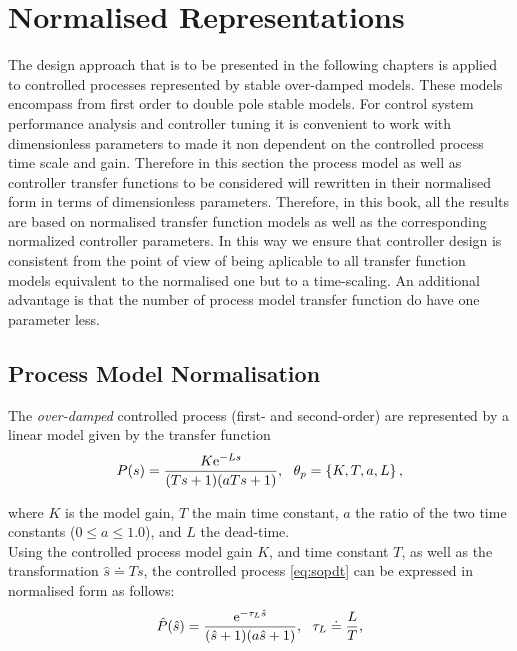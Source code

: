 \section{Normalised Representations}
\label{sec:3}

The design approach that is to be presented in the following chapters is applied to controlled processes represented by stable over-damped models. These models encompass from first order to double pole stable models. For control system performance analysis and controller tuning it is convenient to work with dimensionless parameters to made it non dependent on the controlled process time scale and gain. Therefore in this section the process model as well as controller transfer functions to be considered will rewritten in their normalised form in terms of dimensionless parameters.  Therefore, in this book, all the results are based on normalised transfer function models as well as the corresponding normalized controller parameters. In this way we ensure that controller design is consistent from the point of view of being aplicable to all transfer function models equivalent to the normalised one but to a time-scaling.  An additional advantage is that the number of process model transfer function do have one parameter less.\\

\subsection{Process Model Normalisation}
\label{sec:3.2}

The \emph{over-damped} controlled process (first- and second-order) are represented by a linear model given by the transfer function
\begin{equation}
	P(s) = \frac{K \me^{-L s}}{(T s+1)(a T s+1)}, \ \ \theta_p=\left\{K, T, a, L \right\}, \label{eq:sopdt} 
\end{equation}

\noindent where $K$ is the model gain, $T$ the main time constant, $a$ the ratio of the two time constants ($0 \leq a \leq 1.0$), and $L$ the dead-time.\\

Using the controlled process model gain $K$, and time constant $T$, as well as the transformation $\hat s \doteq T s$, the controlled process \eqref{eq:sopdt} can be expressed in normalised form as follows:
\begin{equation}
	\hat P(\hat s) = \frac{\mathrm{e}^{-\tau_L \hat s}}{(\hat s +1)(a \hat s +1)}, \ \ \tau_L \doteq \frac{L}{T}, \label{eq:sopdtn}
\end{equation}


